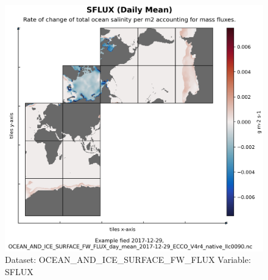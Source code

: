 \begin{figure}[H]
\centering
\includegraphics[scale=0.55]{../images/plots/native_plots/Ocean_and_Sea-Ice_Surface_Freshwater_Fluxes/SFLUX.png}
\caption{Dataset: OCEAN\_AND\_ICE\_SURFACE\_FW\_FLUX Variable: SFLUX}
\label{tab:table-OCEAN_AND_ICE_SURFACE_FW_FLUX_SFLUX-Plot}
\end{figure}
\pagebreak
